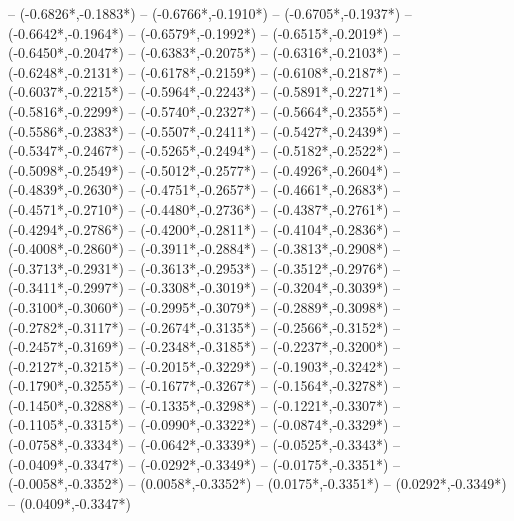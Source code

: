 {	-- ({-0.6826*\dx},{-0.1883*\dy})
	-- ({-0.6766*\dx},{-0.1910*\dy})
	-- ({-0.6705*\dx},{-0.1937*\dy})
	-- ({-0.6642*\dx},{-0.1964*\dy})
	-- ({-0.6579*\dx},{-0.1992*\dy})
	-- ({-0.6515*\dx},{-0.2019*\dy})
	-- ({-0.6450*\dx},{-0.2047*\dy})
	-- ({-0.6383*\dx},{-0.2075*\dy})
	-- ({-0.6316*\dx},{-0.2103*\dy})
	-- ({-0.6248*\dx},{-0.2131*\dy})
	-- ({-0.6178*\dx},{-0.2159*\dy})
	-- ({-0.6108*\dx},{-0.2187*\dy})
	-- ({-0.6037*\dx},{-0.2215*\dy})
	-- ({-0.5964*\dx},{-0.2243*\dy})
	-- ({-0.5891*\dx},{-0.2271*\dy})
	-- ({-0.5816*\dx},{-0.2299*\dy})
	-- ({-0.5740*\dx},{-0.2327*\dy})
	-- ({-0.5664*\dx},{-0.2355*\dy})
	-- ({-0.5586*\dx},{-0.2383*\dy})
	-- ({-0.5507*\dx},{-0.2411*\dy})
	-- ({-0.5427*\dx},{-0.2439*\dy})
	-- ({-0.5347*\dx},{-0.2467*\dy})
	-- ({-0.5265*\dx},{-0.2494*\dy})
	-- ({-0.5182*\dx},{-0.2522*\dy})
	-- ({-0.5098*\dx},{-0.2549*\dy})
	-- ({-0.5012*\dx},{-0.2577*\dy})
	-- ({-0.4926*\dx},{-0.2604*\dy})
	-- ({-0.4839*\dx},{-0.2630*\dy})
	-- ({-0.4751*\dx},{-0.2657*\dy})
	-- ({-0.4661*\dx},{-0.2683*\dy})
	-- ({-0.4571*\dx},{-0.2710*\dy})
	-- ({-0.4480*\dx},{-0.2736*\dy})
	-- ({-0.4387*\dx},{-0.2761*\dy})
	-- ({-0.4294*\dx},{-0.2786*\dy})
	-- ({-0.4200*\dx},{-0.2811*\dy})
	-- ({-0.4104*\dx},{-0.2836*\dy})
	-- ({-0.4008*\dx},{-0.2860*\dy})
	-- ({-0.3911*\dx},{-0.2884*\dy})
	-- ({-0.3813*\dx},{-0.2908*\dy})
	-- ({-0.3713*\dx},{-0.2931*\dy})
	-- ({-0.3613*\dx},{-0.2953*\dy})
	-- ({-0.3512*\dx},{-0.2976*\dy})
	-- ({-0.3411*\dx},{-0.2997*\dy})
	-- ({-0.3308*\dx},{-0.3019*\dy})
	-- ({-0.3204*\dx},{-0.3039*\dy})
	-- ({-0.3100*\dx},{-0.3060*\dy})
	-- ({-0.2995*\dx},{-0.3079*\dy})
	-- ({-0.2889*\dx},{-0.3098*\dy})
	-- ({-0.2782*\dx},{-0.3117*\dy})
	-- ({-0.2674*\dx},{-0.3135*\dy})
	-- ({-0.2566*\dx},{-0.3152*\dy})
	-- ({-0.2457*\dx},{-0.3169*\dy})
	-- ({-0.2348*\dx},{-0.3185*\dy})
	-- ({-0.2237*\dx},{-0.3200*\dy})
	-- ({-0.2127*\dx},{-0.3215*\dy})
	-- ({-0.2015*\dx},{-0.3229*\dy})
	-- ({-0.1903*\dx},{-0.3242*\dy})
	-- ({-0.1790*\dx},{-0.3255*\dy})
	-- ({-0.1677*\dx},{-0.3267*\dy})
	-- ({-0.1564*\dx},{-0.3278*\dy})
	-- ({-0.1450*\dx},{-0.3288*\dy})
	-- ({-0.1335*\dx},{-0.3298*\dy})
	-- ({-0.1221*\dx},{-0.3307*\dy})
	-- ({-0.1105*\dx},{-0.3315*\dy})
	-- ({-0.0990*\dx},{-0.3322*\dy})
	-- ({-0.0874*\dx},{-0.3329*\dy})
	-- ({-0.0758*\dx},{-0.3334*\dy})
	-- ({-0.0642*\dx},{-0.3339*\dy})
	-- ({-0.0525*\dx},{-0.3343*\dy})
	-- ({-0.0409*\dx},{-0.3347*\dy})
	-- ({-0.0292*\dx},{-0.3349*\dy})
	-- ({-0.0175*\dx},{-0.3351*\dy})
	-- ({-0.0058*\dx},{-0.3352*\dy})
	-- ({0.0058*\dx},{-0.3352*\dy})
	-- ({0.0175*\dx},{-0.3351*\dy})
	-- ({0.0292*\dx},{-0.3349*\dy})
	-- ({0.0409*\dx},{-0.3347*\dy})
}
